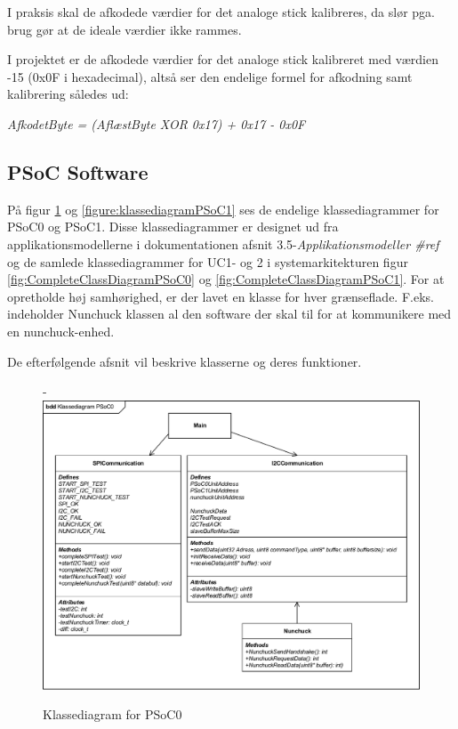\noindent I praksis skal de afkodede værdier for det analoge stick kalibreres, da slør pga. brug gør at de ideale værdier ikke rammes. \newline 

\noindent I projektet er de afkodede værdier for det analoge stick kalibreret med værdien -15 (0x0F i hexadecimal), altså ser den endelige formel for afkodning samt kalibrering således ud: \newline 

\noindent \textit{AfkodetByte = (AflæstByte XOR 0x17) + 0x17 - 0x0F} \newline 

\subsection{PSoC Software}
På figur \ref{figure:klassediagramPSoC0} og \ref{figure:klassediagramPSoC1} ses de endelige klassediagrammer for PSoC0 og PSoC1. Disse klassediagrammer er designet ud fra applikationsmodellerne i dokumentationen afsnit 3.5-\textit{Applikationsmodeller \#ref} og de samlede klassediagrammer for UC1- og 2 i systemarkitekturen figur \ref{fig:CompleteClassDiagramPSoC0} og \ref{fig:CompleteClassDiagramPSoC1}. For at opretholde høj samhørighed, er der lavet en klasse for hver grænseflade. F.eks. indeholder Nunchuck klassen al den software der skal til for at kommunikere med en nunchuck-enhed. \newline 

\noindent De efterfølgende afsnit vil beskrive klasserne og deres funktioner. 

\begin{figure}[H]
	\begin{adjustwidth}{-2cm}{-\rightmargin}
		\centering
		\includegraphics[width=1.35\textwidth]{DesignOgImplementering/images/PSoC0KlassediagramOversigt.pdf}
		\caption{Klassediagram for PSoC0}
		\label{figure:klassediagramPSoC0}
	\end{adjustwidth}
\end{figure}

